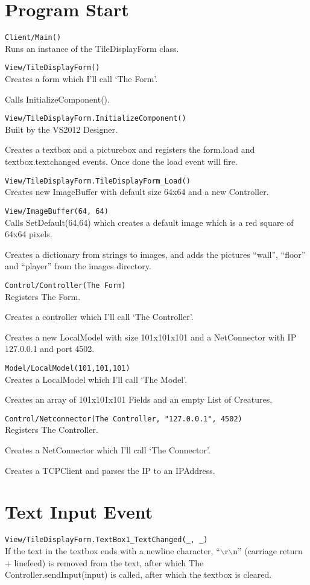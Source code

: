 \documentclass{article}
\begin{document}
	\section{Program Start}
		\texttt{Client/Main()}\\
			Runs an instance of the TileDisplayForm class.
		
		\texttt{View/TileDisplayForm()}\\
			Creates a form which I'll call `The Form'.
		
			Calls InitializeComponent().
		
		\texttt{View/TileDisplayForm.InitializeComponent()}\\
			Built by the VS2012 Designer.
			
			Creates a textbox and a picturebox and registers the form.load and textbox.textchanged events. Once done the load event will fire.
			
		\texttt{View/TileDisplayForm.TileDisplayForm\_Load()}\\
			Creates new ImageBuffer with default size 64x64 and a new Controller.
			
		\texttt{View/ImageBuffer(64, 64)}\\
			Calls SetDefault(64,64) which creates a default image which is a red square of 64x64 pixels.
			
			Creates a dictionary from strings to images, and adds the pictures ``wall'', ``floor'' and ``player'' from the images directory.
		
		\texttt{Control/Controller(The Form)}\\
			Registers The Form.
		
			Creates a controller which I'll call `The Controller'.
		
			Creates a new LocalModel with size 101x101x101 and a NetConnector with IP 127.0.0.1 and port 4502.
			
		\texttt{Model/LocalModel(101,101,101)}\\
			Creates a LocalModel which I'll call `The Model'.
		
			Creates an array of 101x101x101 Fields and an empty List of Creatures.
			
		\texttt{Control/Netconnector(The Controller, "127.0.0.1", 4502)}\\
			Registers The Controller.
		
			Creates a NetConnector which I'll call `The Connector'.
			
			Creates a TCPClient and parses the IP to an IPAddress.
	\section{Text Input Event}
		\texttt{View/TileDisplayForm.TextBox1\_TextChanged(\_, \_)}\\
			If the text in the textbox ends with a newline character, ``$\backslash$r$\backslash$n'' (carriage return + linefeed) is removed from the text, after which
			The Controller.sendInput(input) is called, after which the textbox is cleared.
			
\end{document}
